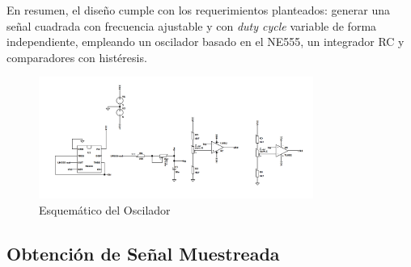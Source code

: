 En resumen, el diseño cumple con los requerimientos planteados: generar una señal cuadrada con frecuencia ajustable y con \textit{duty cycle} variable de forma independiente, empleando un oscilador basado en el NE555, un integrador RC y comparadores con histéresis.
\begin{figure}[H]
    \centering
    \includegraphics[width=0.8\textwidth]{Imagenes/esquematico_oscilador.png}
    \caption{Esquemático del Oscilador}
    \label{esquematico_oscilador}
\end{figure}
\subsection{Obtención de Señal Muestreada}

